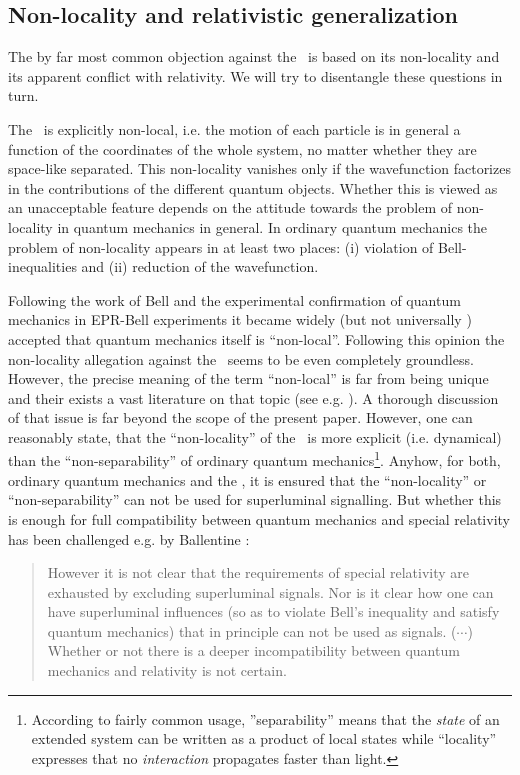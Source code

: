 \subsection{Non-locality and relativistic generalization \label{n-l}}
The by far most common objection against the \dbb\  is based on its non-locality and its apparent conflict 
with relativity. We will try to disentangle these questions in turn. 

The \dbb\ is explicitly non-local, i.e. the motion of each particle is in general a 
function of the coordinates of the whole system, no matter whether they are space-like separated. This non-locality vanishes only 
if the wavefunction factorizes in the contributions of the different 
quantum objects.
Whether this is viewed as an unacceptable feature depends on the attitude towards 
the problem of non-locality in quantum mechanics in general. In ordinary quantum mechanics the problem of non-locality appears 
in at least two places: (i) violation of Bell-inequalities and (ii) reduction of the wavefunction.

Following the work of Bell \cite{bell_ungl} and the 
experimental confirmation of quantum mechanics in EPR-Bell experiments \cite{aspect} it 
became widely (but not universally \cite{tellus,muynck}) accepted that quantum mechanics itself is 
``non-local''. Following this opinion the non-locality allegation against the \dbb\ seems to be even completely
groundless. However, the precise meaning of the term ``non-local'' is far from being unique and 
their exists a vast literature on that topic (see e.g. \cite{cushing}). A thorough 
discussion of that issue is far beyond the scope of the present paper. However, one 
can reasonably state, that the ``non-locality'' of the \dbb\ is more explicit 
(i.e. dynamical) than the ``non-separability'' of ordinary quantum mechanics\footnote{
According to fairly common usage, ''separability'' means that the {\em state} of an 
extended system can be written as a product of local states while ``locality'' expresses 
that no {\em interaction} propagates faster than light.}. 
Anyhow, for both, ordinary quantum mechanics and the \dbb, it is ensured that the ``non-locality'' or ``non-separability''
can not be used for superluminal signalling. But whether this is enough for full compatibility
between quantum mechanics and special relativity has been challenged e.g. by Ballentine \cite{ballentine}:
\begin{quote} 
However it is not clear that the requirements of special 
relativity are exhausted by excluding superluminal signals. Nor is 
it clear how one can have superluminal influences (so as to 
violate Bell's inequality and satisfy quantum mechanics) that in 
principle can not be used as signals. ($\cdots$) Whether or not there 
is a deeper incompatibility between quantum mechanics and 
relativity is not certain. 
\end{quote} 

